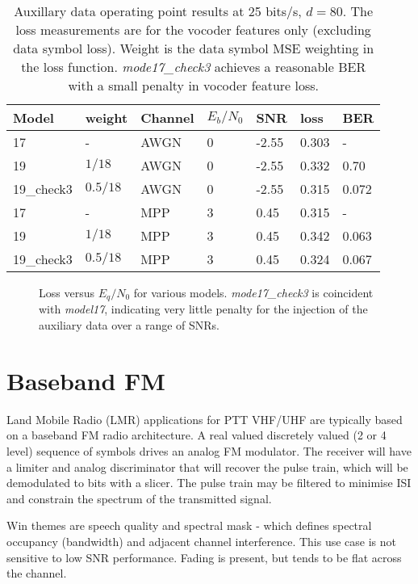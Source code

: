 \documentclass{article}
\begin{document}
\begin{table} [H]
\centering
\begin{tabular}{ l | l | l | l | l | l | l}
 \hline
 Model & weight & Channel & $E_b/N_0$ & SNR & loss & BER \\
 \hline
 17 & - & AWGN & 0 & -2.55 & 0.303 & - \\
 19 & $1/18$ & AWGN & 0 & -2.55 & 0.332 & 0.70 \\
 19\_check3 & $0.5/18$ & AWGN & 0 & -2.55 & 0.315 & 0.072 \\
 17 & - & MPP & 3 & 0.45 & 0.315 & - \\
 19 & $1/18$ & MPP & 3 & 0.45 & 0.342 & 0.063 \\
 19\_check3 & $0.5/18$ & MPP & 3 & 0.45 & 0.324 & 0.067 \\
 \hline
\end{tabular}
\caption{Auxillary data operating point results at 25 bits/s, $d=80$. The loss measurements are for the vocoder features only (excluding data symbol loss). Weight is the data symbol MSE weighting in the loss function. \emph{mode17\_check3} achieves a reasonable BER with a small penalty in vocoder feature loss.}
\label{tab:acq_data}
\end{table}

\begin{figure}[H]
\caption{Loss versus $E_q/N_0$ for various models. \emph{mode17\_check3} is coincident with  \emph{model17}, indicating very little penalty for the injection of the auxiliary data over a range of SNRs.}
\label{fig:loss_eqno_models}
\begin{center}

\end{center}
\end{figure}

\section{Baseband FM}

Land Mobile Radio (LMR) applications for PTT VHF/UHF are typically based on a baseband FM radio architecture. A real valued discretely valued (2 or 4 level) sequence of symbols drives an analog FM modulator.  The receiver will have a limiter and analog discriminator that will recover the pulse train, which will be demodulated to bits with a slicer.  The pulse train may be filtered to minimise ISI and constrain the spectrum of the transmitted signal.

Win themes are speech quality and spectral mask - which defines spectral occupancy (bandwidth) and adjacent channel interference. This use case is not sensitive to low SNR performance.  Fading is present, but tends to be flat across the channel.
\end{document}
